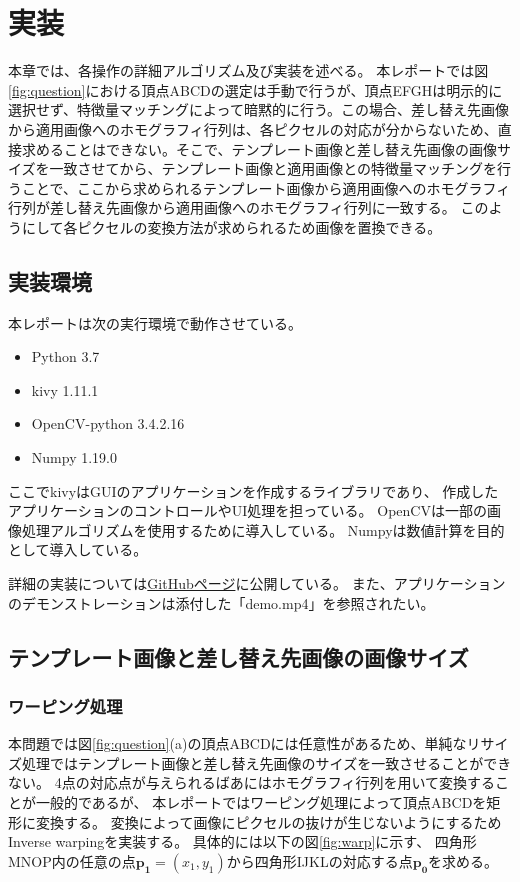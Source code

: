 \section{実装}\label{sec:impl}
本章では、各操作の詳細アルゴリズム及び実装を述べる。
本レポートでは図\ref{fig:question}における頂点ABCDの選定は手動で行うが、頂点EFGHは明示的に選択せず、特徴量マッチングによって暗黙的に行う。この場合、差し替え先画像から適用画像へのホモグラフィ行列は、各ピクセルの対応が分からないため、直接求めることはできない。そこで、テンプレート画像と差し替え先画像の画像サイズを一致させてから、テンプレート画像と適用画像との特徴量マッチングを行うことで、ここから求められるテンプレート画像から適用画像へのホモグラフィ行列が差し替え先画像から適用画像へのホモグラフィ行列に一致する。
このようにして各ピクセルの変換方法が求められるため画像を置換できる。

\subsection{実装環境}
本レポートは次の実行環境で動作させている。
\begin{itemize}
    \item Python 3.7
    \item kivy 1.11.1
    \item OpenCV-python 3.4.2.16
    \item Numpy 1.19.0
\end{itemize}

ここでkivyはGUIのアプリケーションを作成するライブラリであり、
作成したアプリケーションのコントロールやUI処理を担っている。
OpenCVは一部の画像処理アルゴリズムを使用するために導入している。
Numpyは数値計算を目的として導入している。

詳細の実装については\href{https://github.com/SakumaTakuya/cv_finalreport}{GitHubページ}に公開している。
また、アプリケーションのデモンストレーションは添付した「demo.mp4」を参照されたい。

\subsection{テンプレート画像と差し替え先画像の画像サイズ}
\subsubsection{ワーピング処理}
本問題では図\ref{fig:question}(a)の頂点ABCDには任意性があるため、単純なリサイズ処理ではテンプレート画像と差し替え先画像のサイズを一致させることができない。
4点の対応点が与えられるばあにはホモグラフィ行列を用いて変換することが一般的であるが、
本レポートではワーピング処理によって頂点ABCDを矩形に変換する。
変換によって画像にピクセルの抜けが生じないようにするためInverse warpingを実装する。
具体的には以下の図\ref{fig:warp}に示す、
四角形MNOP内の任意の点$\bm{p_1}=(x_1, y_1)$から四角形IJKLの対応する点$\bm{p_0}$を求める。

